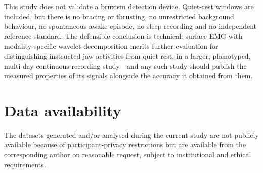 \documentclass[pdflatex,sn-nature,iicol]{sn-jnl}
\begin{document}
This study does not validate a bruxism detection device. Quiet-rest windows are included, but there is no bracing or thrusting, no unrestricted background behaviour, no spontaneous awake episode, no sleep recording and no independent reference standard. The defensible conclusion is technical: surface EMG with modality-specific wavelet decomposition merits further evaluation for distinguishing instructed jaw activities from quiet rest, in a larger, phenotyped, multi-day continuous-recording study---and any such study should publish the measured properties of its signals alongside the accuracy it obtained from them.

\backmatter

\section*{Data availability}
The datasets generated and/or analysed during the current study are not publicly available because of participant-privacy restrictions but are available from the corresponding author on reasonable request, subject to institutional and ethical requirements.
\end{document}
